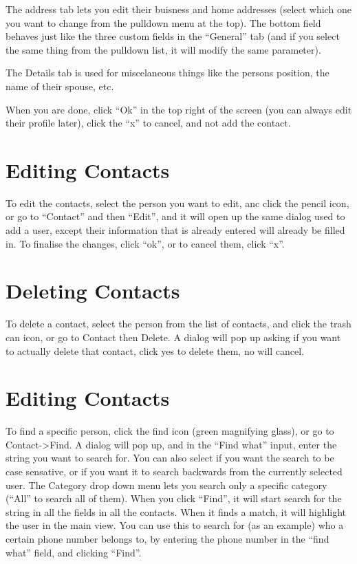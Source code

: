 \documentclass[12pt,letterpaper,oneside, openany]{book} \usepackage[latin1] {inputenc}
\begin{document}
The address tab lets you edit their buisness and home addresses (select which one you want to change from the pulldown menu at the top). The bottom field behaves just like the three custom fields in the ``General'' tab (and if you select the same thing from the pulldown list, it will modify the same parameter). 

The Details tab is used for miscelaneous things like the persons position, the name of their spouse, etc. 

When you are done, click ``Ok'' in the top right of the screen (you can always edit their profile later), click the ``x'' to cancel, and not add the contact. 

\section{Editing Contacts}

To edit the contacts, select the person you want to edit, anc click the pencil icon, or go to ``Contact'' and then ``Edit'', and it will open up the same dialog used to add a user, except their information that is already entered will already be filled in. To finalise the changes, click ``ok'', or to cancel them, click ``x''. 

\section{Deleting Contacts}

To delete a contact, select the person from the list of contacts, and click the trash can icon, or go to Contact then Delete. A dialog will pop up asking if you want to actually delete that contact, click yes to delete them, no will cancel. 

\section{Editing Contacts}

To find a specific person, click the find icon (green magnifying glass), or go to Contact->Find. A dialog will pop up, and in the ``Find what'' input, enter the string you want to search for. You can also select if you want the search to be case sensative, or if you want it to search backwards from the currently selected user. The Category drop down menu lets you search only a specific category (``All'' to search all of them). When you click ``Find'', it will start search for the string in all the fields in all the contacts. When it finds a match, it will highlight the user in the main view. You can use this to search for (as an example) who a certain phone number belongs to, by entering the phone number in the ``find what'' field, and clicking ``Find''. 
\end{document}
